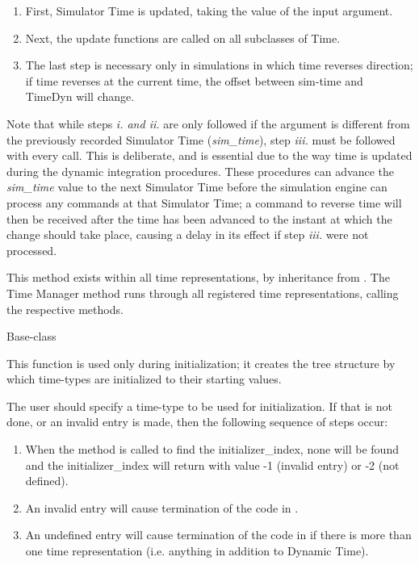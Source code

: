 {\begin{enumerate}
{\begin{enumerate}
\begin{enumerate}
\item First, Simulator Time is updated, taking the value of the input argument.
\item Next, the update functions are called on all subclasses of Time.
\item The last step is necessary only in simulations in which time
reverses direction;  if time reverses at the current time, the offset
between sim-time and TimeDyn will change.
\end{enumerate}

Note that while steps \textit{i. and ii.} are only followed if the argument is
different from the previously recorded Simulator Time (\textit{sim\_time}), 
step
\textit{iii.} must be followed with every call.  This is deliberate, and is
essential due to the way time is updated during the dynamic integration
procedures.  These procedures can advance the \textit{sim\_time} value to the
next Simulator Time before the simulation engine can process any commands at
that Simulator Time; a command to reverse time will then be received after the
time has been advanced to the instant at which the change should take place,
causing a delay in its effect if step \textit{iii.} were not processed.

This method exists within all time representations, by inheritance from
.  The Time Manager method runs through all registered 
time
representations, calling the respective methods.
\end{enumerate}}


  \label {ref:timemanagerinit} 
  Base-class


{\begin{enumerate}
\label{ref:createinittree}This function is used only during
initialization; it creates the tree structure by which time-types
are initialized to their starting values.

The user should specify a time-type to be used for initialization.  If
that is not done, or an invalid entry is made, then the following
sequence of steps occur:


\begin{enumerate}
\item When the method 
is
called to find the initializer\_index, none will be found and the
initializer\_index will return with value -1 (invalid entry) or -2 (not
defined).
\item An invalid entry will cause termination of the code in
.
\item An undefined entry will cause termination of the code in
if there is more than one time
representation (i.e. anything in addition to Dynamic Time).
\end{enumerate}


\end{enumerate}}
\end{enumerate}}
